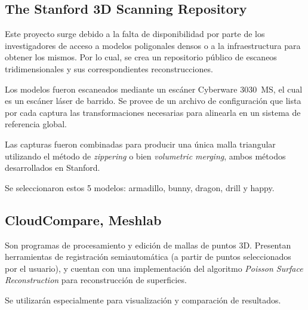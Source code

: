 		\subsection{The Stanford 3D Scanning Repository}

			Este proyecto surge debido a la falta de disponibilidad
			por parte de los investigadores
			de acceso a modelos poligonales densos
				o a la infraestructura para obtener los mismos.
			Por lo cual, se crea un repositorio público de
			escaneos tridimensionales y sus correspondientes reconstrucciones.

			Los modelos fueron escaneados mediante un escáner Cyberware 3030~MS,
			el cual es un escáner láser de barrido.
			Se provee de un archivo de configuración que lista por cada captura
			las transformaciones necesarias para alinearla en un sistema de
			referencia global.

			Las capturas fueron combinadas para producir una única malla
			triangular utilizando el método de \emph{zippering} o bien
			\emph{volumetric merging}, ambos métodos desarrollados en Stanford.\cite{StanfordScanRep}


			Se seleccionaron estos 5 modelos: armadillo, bunny, dragon, drill y happy.

		\subsection{CloudCompare, Meshlab}
			Son programas de procesamiento y edición de mallas de puntos 3D.
			Presentan herramientas de registración semiautomática (a partir de
			puntos seleccionados por el usuario), y cuentan con una
			implementación del algoritmo \emph{Poisson Surface Reconstruction}
			para reconstrucción de superficies.

			Se utilizarán especialmente para visualización
			y comparación de resultados.



